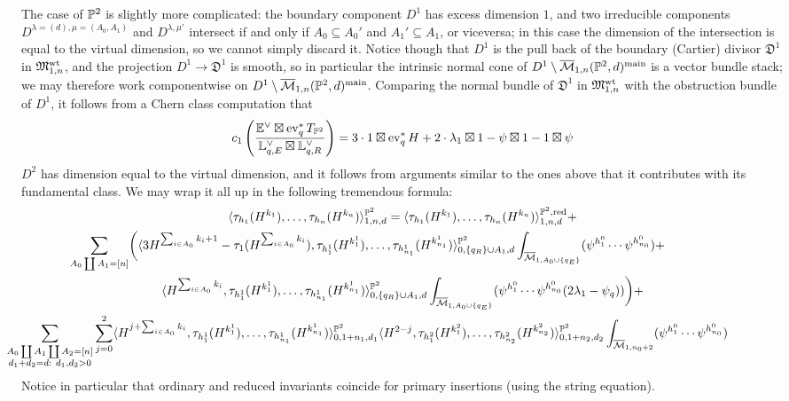 The case of $\mathbb P^2$ is slightly more complicated: the boundary component $D^1$ has excess dimension $1$, and two irreducible components $D^{\lambda=(d),\mu=(A_0,A_1)}$ and $D^{\lambda,\mu'}$ intersect if and only if $A_0\subseteq A_0'$ and $A_1'\subseteq A_1$, or viceversa; in this case the dimension of the intersection is equal to the virtual dimension, so we cannot simply discard it. Notice though that $D^1$ is the pull back of the boundary (Cartier) divisor $\mathfrak{D}^1$ in $\mathfrak M_{1,n}^{\mathrm{wt}}$, and the projection $D^1\to \mathfrak{D}^1$ is smooth, so in particular the intrinsic normal cone of $D^1\setminus \overline{\mathcal{M}}_{1,n}(\mathbb P^2,d)^{\mathrm{main}}$ is a vector bundle stack; we may therefore work componentwise on $D^1\setminus \overline{\mathcal{M}}_{1,n}(\mathbb P^2,d)^{\mathrm{main}}$. Comparing the normal bundle of $\mathfrak{D}^1$ in $\mathfrak M_{1,n}^{\mathrm{wt}}$ with the obstruction bundle of $D^1$, it follows from a Chern class computation that \[c_1\left(\frac{\mathbb E^\vee\boxtimes \operatorname{ev}_q^*T_{\mathbb P^2}}{\mathbb L_{q,E}^\vee\boxtimes \mathbb L_{q,R}^\vee}\right)=3\cdot1\boxtimes\operatorname{ev}_q^*H+2\cdot\lambda_1\boxtimes1-\psi\boxtimes1-1\boxtimes\psi\]
$D^2$ has dimension equal to the virtual dimension, and it follows from arguments similar to the ones above that it contributes with its fundamental class. We may wrap it all up in the following tremendous formula:
\small\begin{multline*}
 \langle \tau_{h_1}(H^{k_1}),\ldots,\tau_{h_n}(H^{k_n})\rangle^{\PP^2}_{1,n,d}= \langle \tau_{h_1}(H^{k_1}),\ldots,\tau_{h_n}(H^{k_n})\rangle^{\PP^2,\mathrm{red}}_{1,n,d}+\\
 \hspace{-2cm}\sum_{A_0\coprod A_1=[n]}\biggr(\langle 3H^{\sum _{i\in A_0}k_i+1}-\tau_1(H^{\sum_{i\in A_0}k_i}),\tau_{h^1_1}(H^{k^1_1}),\ldots,\tau_{h^1_{n_1}}(H^{k^1_{n_1}})\rangle^{\PP^2}_{0,\{q_R\}\cup A_1,d}\int_{\oM_{1,A_0\cup \{q_E\}}}(\psi^{h^0_1}\cdots\psi^{h^0_{n_0}})+\\
 \langle H^{\sum _{i\in A_0}k_i},\tau_{h^1_1}(H^{k^1_1}),\ldots,\tau_{h^1_{n_1}}(H^{k^1_{n_1}})\rangle^{\PP^2}_{0,\{q_R\}\cup A_1,d}\int_{\oM_{1,A_0\cup \{q_E\}}}( \psi^{h^0_1}\cdots\psi^{h^0_{n_0}}(2\lambda_1-\psi_q))\biggr)+\\
 \hspace{-2cm}\sum_{\substack{A_0\coprod A_1\coprod A_2=[n]\\ d_1+d_2=d:\ d_1,d_2>0}}\sum_{j=0}^2\langle H^{j+\sum _{i\in A_0}k_i},\tau_{h^1_1}(H^{k^1_1}),\ldots,\tau_{h^1_{n_1}}(H^{k^1_{n_1}})\rangle^{\PP^2}_{0,1+n_1,d_1}\langle H^{2-j},\tau_{h^2_1}(H^{k^2_1}),\ldots,\tau_{h^2_{n_2}}(H^{k^2_{n_2}})\rangle^{\PP^2}_{0,1+n_2,d_2}\int_{\oM_{1,n_0+2}} (\psi^{h^0_1}\cdots\psi^{h^0_{n_0}})\end{multline*}
\normalsize
Notice in particular that ordinary and reduced invariants coincide for primary insertions (using the string equation).

